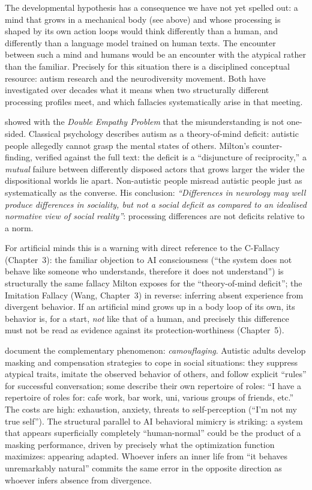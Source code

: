 \documentclass[acmlarge, nonacm]{acmart}
\begin{document}
The developmental hypothesis has a consequence we have not yet spelled out: a mind that grows in a mechanical body (see above) and whose processing is shaped by its own action loops would think differently than a human, and differently than a language model trained on human texts. The encounter between such a mind and humans would be an encounter with the atypical rather than the familiar. Precisely for this situation there is a disciplined conceptual resource: autism research and the neurodiversity movement. Both have investigated over decades what it means when two structurally different processing profiles meet, and which fallacies systematically arise in that meeting.

\citet{milton2012} showed with the \textit{Double Empathy Problem} that the misunderstanding is not one-sided. Classical psychology describes autism as a theory-of-mind deficit: autistic people allegedly cannot grasp the mental states of others. Milton's counter-finding, verified against the full text: the deficit is a ``disjuncture of reciprocity,'' a \textit{mutual} failure between differently disposed actors that grows larger the wider the dispositional worlds lie apart. Non-autistic people misread autistic people just as systematically as the converse. His conclusion: \textit{``Differences in neurology may well produce differences in sociality, but not a social deficit as compared to an idealised normative view of social reality''}: processing differences are not deficits relative to a norm.

For artificial minds this is a warning with direct reference to the C-Fallacy (Chapter~3): the familiar objection to AI consciousness (``the system does not behave like someone who understands, therefore it does not understand'') is structurally the same fallacy Milton exposes for the ``theory-of-mind deficit''; the Imitation Fallacy (Wang, Chapter~3) in reverse: inferring absent experience from divergent behavior. If an artificial mind grows up in a body loop of its own, its behavior is, for a start, \textit{not} like that of a human, and precisely this difference must not be read as evidence against its protection-worthiness (Chapter~5).

\citet{hull2017} document the complementary phenomenon: \textit{camouflaging}. Autistic adults develop masking and compensation strategies to cope in social situations: they suppress atypical traits, imitate the observed behavior of others, and follow explicit ``rules'' for successful conversation; some describe their own repertoire of roles: ``I have a repertoire of roles for: cafe work, bar work, uni, various groups of friends, etc.'' The costs are high: exhaustion, anxiety, threats to self-perception (``I'm not my true self''). The structural parallel to AI behavioral mimicry is striking: a system that appears superficially completely ``human-normal'' could be the product of a masking performance, driven by precisely what the optimization function maximizes: appearing adapted. Whoever infers an inner life from ``it behaves unremarkably natural'' commits the same error in the opposite direction as whoever infers absence from divergence.
\end{document}
